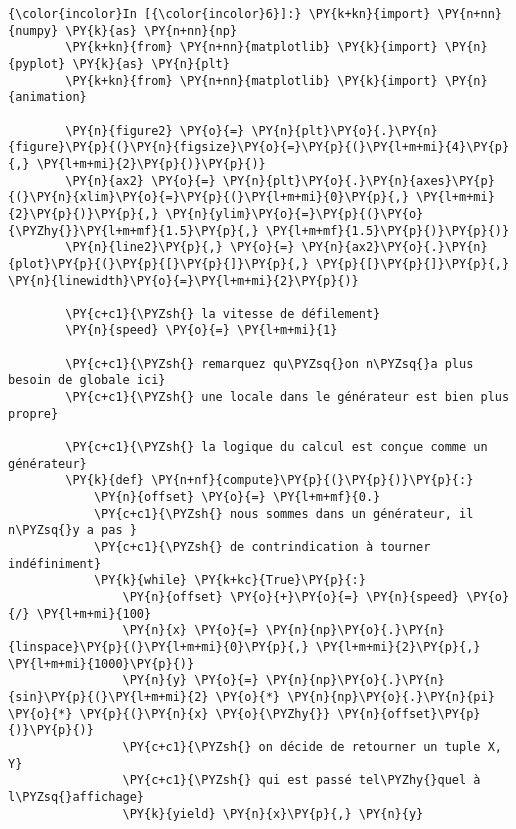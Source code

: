     \begin{Verbatim}[commandchars=\\\{\},frame=single,framerule=0.3mm,rulecolor=\color{cellframecolor}]
{\color{incolor}In [{\color{incolor}6}]:} \PY{k+kn}{import} \PY{n+nn}{numpy} \PY{k}{as} \PY{n+nn}{np}
        \PY{k+kn}{from} \PY{n+nn}{matplotlib} \PY{k}{import} \PY{n}{pyplot} \PY{k}{as} \PY{n}{plt}
        \PY{k+kn}{from} \PY{n+nn}{matplotlib} \PY{k}{import} \PY{n}{animation}
        
        \PY{n}{figure2} \PY{o}{=} \PY{n}{plt}\PY{o}{.}\PY{n}{figure}\PY{p}{(}\PY{n}{figsize}\PY{o}{=}\PY{p}{(}\PY{l+m+mi}{4}\PY{p}{,} \PY{l+m+mi}{2}\PY{p}{)}\PY{p}{)}
        \PY{n}{ax2} \PY{o}{=} \PY{n}{plt}\PY{o}{.}\PY{n}{axes}\PY{p}{(}\PY{n}{xlim}\PY{o}{=}\PY{p}{(}\PY{l+m+mi}{0}\PY{p}{,} \PY{l+m+mi}{2}\PY{p}{)}\PY{p}{,} \PY{n}{ylim}\PY{o}{=}\PY{p}{(}\PY{o}{\PYZhy{}}\PY{l+m+mf}{1.5}\PY{p}{,} \PY{l+m+mf}{1.5}\PY{p}{)}\PY{p}{)}
        \PY{n}{line2}\PY{p}{,} \PY{o}{=} \PY{n}{ax2}\PY{o}{.}\PY{n}{plot}\PY{p}{(}\PY{p}{[}\PY{p}{]}\PY{p}{,} \PY{p}{[}\PY{p}{]}\PY{p}{,} \PY{n}{linewidth}\PY{o}{=}\PY{l+m+mi}{2}\PY{p}{)}
        
        \PY{c+c1}{\PYZsh{} la vitesse de défilement}
        \PY{n}{speed} \PY{o}{=} \PY{l+m+mi}{1}
        
        \PY{c+c1}{\PYZsh{} remarquez qu\PYZsq{}on n\PYZsq{}a plus besoin de globale ici}
        \PY{c+c1}{\PYZsh{} une locale dans le générateur est bien plus propre}
        
        \PY{c+c1}{\PYZsh{} la logique du calcul est conçue comme un générateur}
        \PY{k}{def} \PY{n+nf}{compute}\PY{p}{(}\PY{p}{)}\PY{p}{:}
            \PY{n}{offset} \PY{o}{=} \PY{l+m+mf}{0.}
            \PY{c+c1}{\PYZsh{} nous sommes dans un générateur, il n\PYZsq{}y a pas }
            \PY{c+c1}{\PYZsh{} de contrindication à tourner indéfiniment}
            \PY{k}{while} \PY{k+kc}{True}\PY{p}{:}
                \PY{n}{offset} \PY{o}{+}\PY{o}{=} \PY{n}{speed} \PY{o}{/} \PY{l+m+mi}{100}
                \PY{n}{x} \PY{o}{=} \PY{n}{np}\PY{o}{.}\PY{n}{linspace}\PY{p}{(}\PY{l+m+mi}{0}\PY{p}{,} \PY{l+m+mi}{2}\PY{p}{,} \PY{l+m+mi}{1000}\PY{p}{)}
                \PY{n}{y} \PY{o}{=} \PY{n}{np}\PY{o}{.}\PY{n}{sin}\PY{p}{(}\PY{l+m+mi}{2} \PY{o}{*} \PY{n}{np}\PY{o}{.}\PY{n}{pi} \PY{o}{*} \PY{p}{(}\PY{n}{x} \PY{o}{\PYZhy{}} \PY{n}{offset}\PY{p}{)}\PY{p}{)}
                \PY{c+c1}{\PYZsh{} on décide de retourner un tuple X, Y}
                \PY{c+c1}{\PYZsh{} qui est passé tel\PYZhy{}quel à l\PYZsq{}affichage}
                \PY{k}{yield} \PY{n}{x}\PY{p}{,} \PY{n}{y} 
        

\end{Verbatim}

